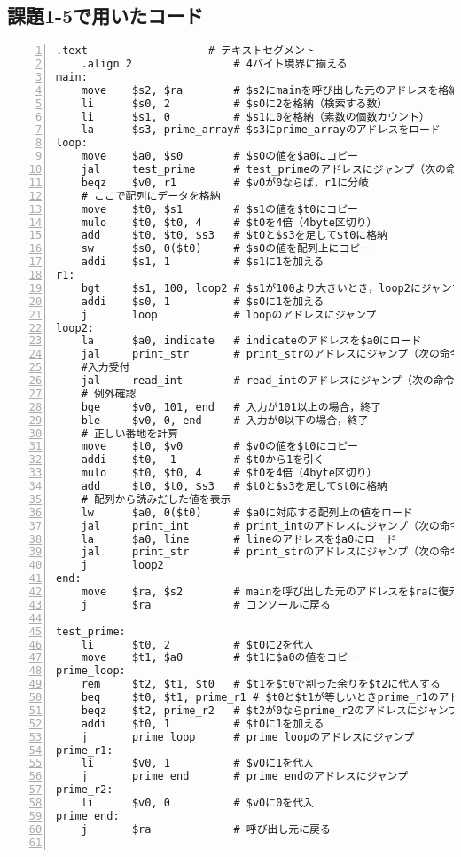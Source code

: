 \subsection{課題1-5で用いたコード} \label{sec:p1-5}
\begin{Verbatim}[numbers=left, xleftmargin=10mm, numbersep=6pt,
                    fontsize=\small, baselinestretch=0.8]
    .text                   # テキストセグメント
    .align 2                # 4バイト境界に揃える
main:
    move    $s2, $ra        # $s2にmainを呼び出した元のアドレスを格納
    li      $s0, 2          # $s0に2を格納（検索する数）
    li      $s1, 0          # $s1に0を格納（素数の個数カウント）
    la      $s3, prime_array# $s3にprime_arrayのアドレスをロード
loop:
    move    $a0, $s0        # $s0の値を$a0にコピー
    jal     test_prime      # test_primeのアドレスにジャンプ（次の命令のアドレスを$raに）
    beqz    $v0, r1         # $v0が0ならば，r1に分岐
    # ここで配列にデータを格納
    move    $t0, $s1        # $s1の値を$t0にコピー
    mulo    $t0, $t0, 4     # $t0を4倍（4byte区切り）
    add     $t0, $t0, $s3   # $t0と$s3を足して$t0に格納
    sw      $s0, 0($t0)     # $s0の値を配列上にコピー
    addi    $s1, 1          # $s1に1を加える
r1:
    bgt     $s1, 100, loop2 # $s1が100より大きいとき，loop2にジャンプ
    addi    $s0, 1          # $s0に1を加える
    j       loop            # loopのアドレスにジャンプ
loop2:
    la      $a0, indicate   # indicateのアドレスを$a0にロード
    jal     print_str       # print_strのアドレスにジャンプ（次の命令のアドレスを$raに）
    #入力受付
    jal     read_int        # read_intのアドレスにジャンプ（次の命令のアドレスを$raに）
    # 例外確認
    bge     $v0, 101, end   # 入力が101以上の場合，終了
    ble     $v0, 0, end     # 入力が0以下の場合，終了
    # 正しい番地を計算
    move    $t0, $v0        # $v0の値を$t0にコピー
    addi    $t0, -1         # $t0から1を引く
    mulo    $t0, $t0, 4     # $t0を4倍（4byte区切り）
    add     $t0, $t0, $s3   # $t0と$s3を足して$t0に格納
    # 配列から読みだした値を表示
    lw      $a0, 0($t0)     # $a0に対応する配列上の値をロード
    jal     print_int       # print_intのアドレスにジャンプ（次の命令のアドレスを$raに）
    la      $a0, line       # lineのアドレスを$a0にロード
    jal     print_str       # print_strのアドレスにジャンプ（次の命令のアドレスを$raに）
    j       loop2
end:
    move    $ra, $s2        # mainを呼び出した元のアドレスを$raに復元
    j       $ra             # コンソールに戻る

test_prime:
    li      $t0, 2          # $t0に2を代入
    move    $t1, $a0        # $t1に$a0の値をコピー
prime_loop:
    rem     $t2, $t1, $t0   # $t1を$t0で割った余りを$t2に代入する
    beq     $t0, $t1, prime_r1 # $t0と$t1が等しいときprime_r1のアドレスにジャンプ
    beqz    $t2, prime_r2   # $t2が0ならprime_r2のアドレスにジャンプ
    addi    $t0, 1          # $t0に1を加える
    j       prime_loop      # prime_loopのアドレスにジャンプ
prime_r1:
    li      $v0, 1          # $v0に1を代入
    j       prime_end       # prime_endのアドレスにジャンプ
prime_r2:
    li      $v0, 0          # $v0に0を代入
prime_end:
    j       $ra             # 呼び出し元に戻る


\end{Verbatim}
